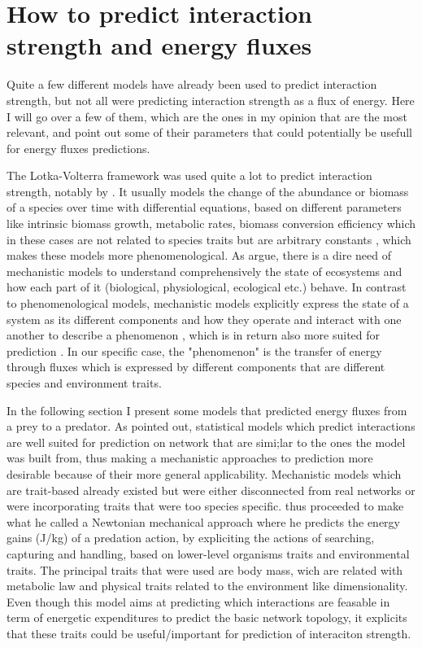 \documentclass[english,12pt]{article}
\begin{document}
\section{How to predict interaction strength and energy fluxes}
Quite a few different models have already been used to predict interaction strength, but not all were predicting interaction strength as a flux of energy. Here I will go over a few of them, which are the ones in my opinion that are the most relevant, and point out some of their parameters that could potentially be usefull for energy fluxes predictions.

The Lotka-Volterra framework was used quite a lot to predict interaction strength, notably by \cite{Yodzis1992BodSiz}. It usually models the change of the abundance or biomass of a species over time with differential equations, based on different parameters like intrinsic biomass growth, metabolic rates, biomass conversion efficiency which in these cases are not related to species traits but are arbitrary constants \citep{Williams2006HomYod}, which makes these models more phenomenological. As \cite{Harfoot2014EmeGlo,Purves2013TimMod} argue, there is a dire need of mechanistic models to understand comprehensively the state of ecosystems and how each part of it (biological, physiological, ecological etc.) behave. In contrast to phenomenological models, mechanistic models explicitly express the state of a system as its different components and how they operate and interact with one another to describe a phenomenon \citep{Connolly2017ProMec}, which is in return also more suited for prediction \citep{Ings2009RevEco}. In our specific case, the "phenomenon" is the transfer of energy through fluxes which is expressed by different components that are different species and environment traits. 

In the following section I present some models that predicted energy fluxes from a prey to a predator. 
As \cite{Portalier2019MecPre} pointed out, statistical models which predict interactions are well suited for prediction on network that are simi;lar to the ones the model was built from, thus making a mechanistic approaches to prediction more desirable because of their more general applicability. Mechanistic models which are trait-based already existed but were either disconnected from real networks or were incorporating traits that were too species specific. \cite{Portalier2019MecPre} thus proceeded to make what he called a Newtonian mechanical approach where he predicts the energy gains (J/kg) of a predation action, by expliciting the actions of searching, capturing and handling, based on lower-level organisms traits and environmental traits. The principal traits that were used are body mass, wich are related with metabolic law and physical traits related to the environment like dimensionality. Even though this model aims at predicting which interactions are feasable in term of energetic expenditures to predict the basic network topology, it explicits that these traits could be useful/important for prediction of interaciton strength.
\end{document}
